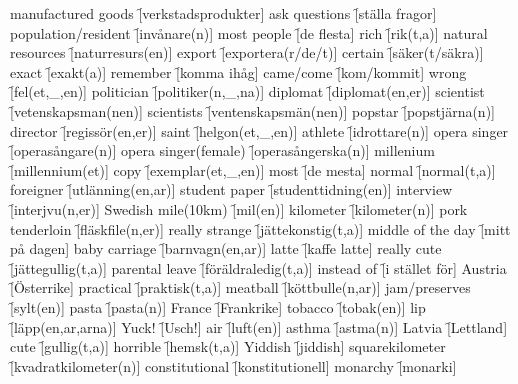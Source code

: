\begin{questions}
\begin{multicols}{2}
        \question manufactured goods \f[verkstadsprodukter]
        \question ask questions \f[ställa fragor]
        \question population/resident \f[invånare(n)]
        \question most people \f[de flesta]
        \question rich \f[rik(t,a)]
        \question natural resources \f[naturresurs(en)]
        \question export \f[exportera(r/de/t)]
        \question certain \f[säker(t/säkra)]
        \question exact \f[exakt(a)]
        \question remember \f[komma ihåg]
        \question came/come \f[kom/kommit]
        \question wrong \f[fel(et,\_,en)]
        \question politician \f[politiker(n,\_,na)]
        \question diplomat \f[diplomat(en,er)]
        \question scientist \f[vetenskapsman(nen)]
        \question scientists \f[ventenskapsmän(nen)]
        \question popstar \f[popstjärna(n)]
        \question director \f[regissör(en,er)]
        \question saint \f[helgon(et,\_,en)]
        \question athlete \f[idrottare(n)]
        \question opera singer \f[operasångare(n)]
        \question opera singer(female) \f[operasångerska(n)]
        \question millenium \f[millennium(et)]
        \question copy \f[exemplar(et,\_,en)]
        \question most \f[de mesta]
        \question normal \f[normal(t,a)]
        \question foreigner \f[utlänning(en,ar)]
        \question student paper \f[studenttidning(en)]
        \question interview \f[interjvu(n,er)]
        \question Swedish mile(10km) \f[mil(en)]
        \question kilometer \f[kilometer(n)]
        \question pork tenderloin \f[fläskfile(n,er)]
        \question really strange \f[jättekonstig(t,a)]
        \question middle of the day \f[mitt på dagen]
        \question baby carriage \f[barnvagn(en,ar)]
        \question latte \f[kaffe latte]
        \question really cute \f[jättegullig(t,a)]
        \question parental leave \f[föräldraledig(t,a)]
        \question instead of \f[i stället för]
        \question Austria \f[Österrike]
        \question practical \f[praktisk(t,a)]
        \question meatball \f[köttbulle(n,ar)]
        \question jam/preserves \f[sylt(en)]
        \question pasta \f[pasta(n)]
        \question France \f[Frankrike]
        \question tobacco \f[tobak(en)]
        \question lip \f[läpp(en,ar,arna)]
        \question Yuck! \f[Usch!]
        \question air \f[luft(en)]
        \question asthma \f[astma(n)]
        \question Latvia \f[Lettland]
        \question cute \f[gullig(t,a)]
        \question horrible \f[hemsk(t,a)]
        \question Yiddish \f[jiddish]
        \question squarekilometer \f[kvadratkilometer(n)]
        \question constitutional \f[konstitutionell]
        \question monarchy \f[monarki]

\end{multicols}
\end{questions}
